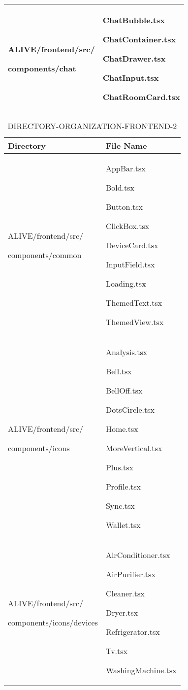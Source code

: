 \documentclass[conference]{IEEEtran}
\begin{document}
\begin{enumerate}
\begin{itemize}
\begin{itemize}
\begin{enumerate}
\begin{table}[h]
\begin{tabular}{|p{3.7cm}|p{4.1cm}|}
          ALIVE/frontend/src/ \par components/chat \par  & ChatBubble.tsx \par ChatContainer.tsx \par ChatDrawer.tsx \par ChatInput.tsx \par ChatRoomCard.tsx
          \\ \hline

    \end{tabular}
\end{table}

\begin{table}[h]
\caption{DIRECTORY-ORGANIZATION-FRONTEND-2}
\def\arraystretch{1.24} \small
    \begin{tabular}{|p{3.7cm}|p{4.1cm}|}
\hline
        Directory & File Name \\ \hline
          ALIVE/frontend/src/ \par components/common \par  & AppBar.tsx \par Bold.tsx \par Button.tsx \par ClickBox.tsx \par DeviceCard.tsx \par InputField.tsx \par Loading.tsx \par ThemedText.tsx \par ThemedView.tsx
          \\ \hline
          
          ALIVE/frontend/src/ \par components/icons \par  & Analysis.tsx \par Bell.tsx \par BellOff.tsx \par DotsCircle.tsx \par Home.tsx \par MoreVertical.tsx \par Plus.tsx \par Profile.tsx \par Sync.tsx \par Wallet.tsx
          \\ \hline
          
          ALIVE/frontend/src/ \par components/icons/devices \par  & AirConditioner.tsx \par AirPurifier.tsx \par Cleaner.tsx \par Dryer.tsx \par Refrigerator.tsx \par Tv.tsx \par WashingMachine.tsx
          \\ \hline
          

\end{tabular}
\end{table}
\end{enumerate}
\end{itemize}
\end{itemize}
\end{enumerate}
\end{document}
